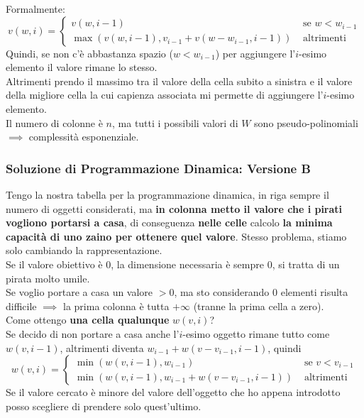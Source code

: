 Formalmente:
$$
v (w,i) = \begin{cases}
	v (w, i-1) & \text{ se } w < w_{i-1} \\
	\max \left(v(w,i-1), v_{i-1} + v (w - w_{i-1}, i-1)\right) & \text{ altrimenti }
\end{cases}
$$
Quindi, se non c'è abbastanza spazio ($w < w_{i-1}$) per aggiungere l'$i$-esimo elemento il valore rimane lo stesso.\\

Altrimenti prendo il massimo tra il valore della cella subito a sinistra e il valore della migliore cella la cui capienza associata mi permette di aggiungere l'$i$-esimo elemento.\\

Il numero di colonne è $n$, ma tutti i possibili valori di $W$ sono pseudo-polinomiali $\implies$ complessità esponenziale.\\

\newpage

\subsubsection{Soluzione di Programmazione Dinamica: Versione B}

Tengo la nostra tabella per la programmazione dinamica, in riga sempre il numero di oggetti considerati, ma \textbf{in colonna metto il valore che i pirati vogliono portarsi a casa}, di conseguenza \textbf{nelle celle} calcolo \textbf{la minima capacità di uno zaino per ottenere quel valore}. Stesso problema, stiamo solo cambiando la rappresentazione.\\

Se il valore obiettivo è 0, la dimensione necessaria è sempre 0, si tratta di un pirata molto umile.\\
Se voglio portare a casa un valore $>0$, ma sto considerando $0$ elementi risulta difficile $\implies$ la prima colonna è tutta $+ \infty$ (tranne la prima cella a zero).\\

Come ottengo \textbf{una cella qualunque} $w(v,i)$?\\

Se decido di non portare a casa anche l'$i$-esimo oggetto rimane tutto come $w(v, i-1)$, altrimenti diventa $w_{i-1} + w (v - v_{i-1}, i-1)$, quindi
$$ w (v,i) = \begin{cases}
	\min \left(w (v, i-1), w_{i-1}\right) & \text { se } v < v_{i-1} \\
	\min \left(w (v, i-1), w_{i-1} + w (v - v_{i-1}, i-1) \right) & \text{ altrimenti }
\end{cases}$$
Se il valore cercato è minore del valore dell'oggetto che ho appena introdotto posso scegliere di prendere solo quest'ultimo.\\


